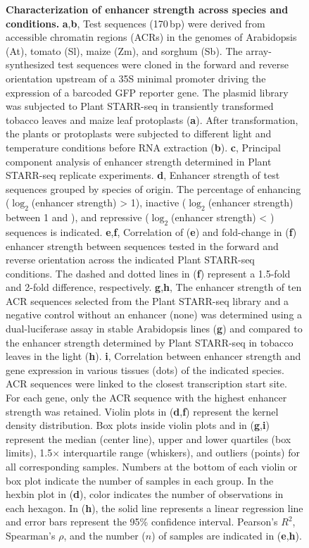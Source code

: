 \documentclass[10pt]{article}
\newcommand{\fignormal}{\scriptsize} %
\newcommand{\usename}[1]{\csname#1\endcsname}
\newif\ifnpc
\newif\ifmain
\newcounter{fig}
\newenvironment{fig}{%
	\begin{figure}[p]%
		\stepcounter{fig}%
		\pdfbookmark{\figurename\ \thefig}{figure\thefig}
		\tikzsetnextfilename{figure\thefig}%
		\fignormal%
		\centering%
}{%
	\end{figure}%
	\clearpage%
	\ifnpc%
		\makenextpagecaption%
		\global\npcfalse%
	\fi%
}
\newcounter{efig}
\newcounter{stab}
\newcommand{\titleend}{ }
\newcommand{\nextentry}{ }
\newcommand{\captiontitle}[2][]{\textbf{#2.}\titleend}
\newif\ifsubfigupper
\newcounter{subfig}[figure]
\newcommand{\subfigrefsep}{,}
\newcommand{\subfigrefand}{,}
\newcommand{\subfigunformatted}[1]{\ifsubfigupper\uppercase{#1}\else\lowercase{#1}\fi}
\newcommand{\plainsubfigref}[1]{\textbf{\subfigunformatted{#1}}}
\newcommand{\subfig}[1]{\plainsubfigref{#1}\subfigrefsep}
\newcommand{\subfigtwo}[2]{\plainsubfigref{#1}\subfigrefand\plainsubfigref{#2}\subfigrefsep}
\newcommand{\parensubfig}[2][]{(#1\plainsubfigref{#2})}
\newcommand{\parensubfigtwo}[3][]{(#1\plainsubfigref{#2}\subfigrefand\plainsubfigref{#3})}
\begin{document}
	\sffamily
	\frenchspacing
	
	\ifmain
		
		\begin{fig}
			\caption{%
				\captiontitle{Characterization of enhancer strength across species and conditions}%
				\subfigtwo{A}{B} Test sequences (170\,bp) were derived from accessible chromatin regions (ACRs) in the genomes of \usename{Arabidopsis} (At), \usename{tomato} (Sl), \usename{maize} (Zm), and \usename{sorghum} (Sb). The array-synthesized test sequences were cloned in the forward and reverse orientation upstream of a 35S minimal promoter driving the expression of a barcoded GFP reporter gene. The plasmid library was subjected to Plant STARR-seq in transiently transformed tobacco leaves and maize leaf protoplasts \parensubfig{A}. After transformation, the plants or protoplasts were subjected to different light and temperature conditions before RNA extraction \parensubfig{B}.\nextentry
				\subfig{C} Principal component analysis of enhancer strength determined in Plant STARR-seq replicate experiments.\nextentry
				\subfig{D} Enhancer strength of test sequences grouped by species of origin. The percentage of enhancing ($\log_2$(enhancer strength) > 1), inactive ($\log_2$(enhancer strength) between 1 and ), and repressive ($\log_2$(enhancer strength) < ) sequences is indicated.\nextentry
				\subfigtwo{E}{F} Correlation of \parensubfig{E} and fold-change in \parensubfig{F} enhancer strength between sequences tested in the forward and reverse orientation across the indicated Plant STARR-seq conditions. The dashed and dotted lines in \parensubfig {F} represent a 1.5-fold and 2-fold difference, respectively. \nextentry
				\subfigtwo{G}{H} The enhancer strength of ten ACR sequences selected from the Plant STARR-seq library and a negative control without an enhancer (none) was determined using a dual-luciferase assay in stable \usename{Arabidopsis} lines \parensubfig{G} and compared to the enhancer strength determined by Plant STARR-seq in tobacco leaves in the light \parensubfig{H}.\nextentry
				\subfig{I} Correlation between enhancer strength and gene expression in various tissues (dots) of the indicated species. ACR sequences were linked to the closest transcription start site. For each gene, only the ACR sequence with the highest enhancer strength was retained.\nextentry
				Violin plots in \parensubfigtwo{D}{F} represent the kernel density distribution. Box plots inside violin plots and in \parensubfigtwo{G}{I} represent the median (center line), upper and lower quartiles (box limits), 1.5$\times$ interquartile range (whiskers), and outliers (points) for all corresponding samples. Numbers at the bottom of each violin or box plot indicate the number of samples in each group. In the hexbin plot in \parensubfig{D}, color indicates the number of observations in each hexagon. In \parensubfig{H}, the solid line represents a linear regression line and error bars represent the 95\% confidence interval. Pearson's $R^2$, Spearman's $\rho$, and the number ($n$) of samples are indicated in \parensubfigtwo{E}{H}. 
			}%
			\label{fig:enhScreen}%
		\end{fig}
		
\end{document}
